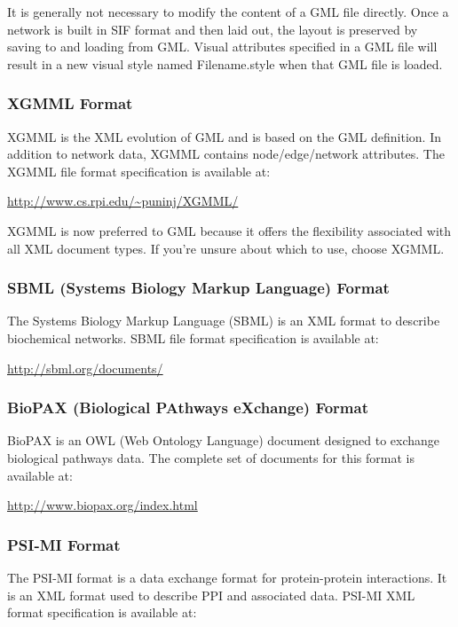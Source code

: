  It is generally not necessary to modify the content of a GML file directly. Once a network is built in SIF format and then laid out, the layout is preserved by saving to and loading from GML. Visual attributes specified in a GML file will result in a new visual style named Filename.style when that GML file is loaded. 


 
\subsubsection*{XGMML Format}


 XGMML is the XML evolution of GML and is based on the GML definition. In addition to network data, XGMML contains node/edge/network attributes. The XGMML file format specification is available at: 


 \url{http://www.cs.rpi.edu/~puninj/XGMML/}


 XGMML is now preferred to GML because it offers the flexibility associated with all XML document types. If you're unsure about which to use, choose XGMML. 


 
\subsubsection*{SBML (Systems Biology Markup Language) Format}


 The Systems Biology Markup Language (SBML) is an XML format to describe biochemical networks. SBML file format specification is available at: 


 \url{http://sbml.org/documents/}


 
\subsubsection*{BioPAX (Biological PAthways eXchange) Format}


 BioPAX is an OWL (Web Ontology Language) document designed to exchange biological pathways data. The complete set of documents for this format is available at: 


 \url{http://www.biopax.org/index.html}


 
\subsubsection*{PSI-MI Format}


 The PSI-MI format is a data exchange format for protein-protein interactions. It is an XML format used to describe PPI and associated data. PSI-MI XML format specification is available at: 


